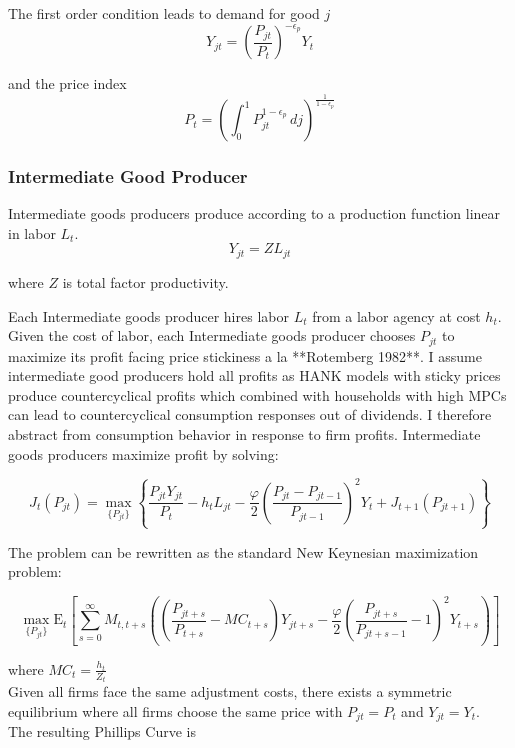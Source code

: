 \documentclass[\econtexRoot/HAFiscal]{subfiles}
\begin{document}
The first order condition leads to demand for good $j$
$$Y_{jt} = \left(\frac {P_{jt}}{P_{t}}\right)^{- \epsilon_{p}} Y_{t}$$

and the price index
$$P_{t} = \left(\int_{0}^{1} P_{jt}^{1-\epsilon_{p}}\,dj \right )^{\frac{1}{1-\epsilon_{p}}}$$


\subsubsection{Intermediate Good Producer}

Intermediate goods producers produce according to a production function linear in labor $L_{t}$. 
$$Y_{jt} =  Z  L_{jt}$$ 

where $Z$ is total factor productivity.
\vspace{.3cm}
  
 Each Intermediate goods producer hires labor $L_{t}$ from a labor agency at cost $h_{t}$. 
 Given the cost of labor, each Intermediate goods producer chooses $P_{jt}$ to maximize its profit facing price stickiness a la **Rotemberg 1982**. I assume intermediate good producers hold all profits as HANK models with sticky prices produce countercyclical profits which combined with households with high MPCs can lead to countercyclical consumption responses out of dividends. I therefore abstract from consumption behavior in response to firm profits. Intermediate goods producers maximize profit by solving:
 
$$J_{t}\left(P_{jt}\right) = \max_{\{P_{jt}\}} \left\{\frac{P_{jt}Y_{jt}}{P_{t}} - h_{t} L_{jt} -  \frac{\varphi}{2}\left( \frac{P_{jt} - P_{jt-1}}{P_{jt-1}} \right)^{2} Y_{t}  + J_{t+1}\left(P_{jt+1}\right) \right\}$$ 

The problem can be rewritten as the standard New Keynesian maximization problem:

$$\max_{\{P_{jt}\}} \mathrm{E}_{t}\left[\sum_{s=0}^{\infty}  M_{t,t+s} \left( \left( \frac{P_{jt+s}}{P_{t+s}} - MC_{t+s}\right)Y_{jt+s} -  \frac{\varphi}{2}\left( \frac{P_{jt+s}}{P_{jt+s-1}} - 1\right)^{2} Y_{t+s} \right)\right]$$ 


where $MC_{t} = \frac{h_{t}}{Z_{t}}  $ \\



Given all firms face the same adjustment costs, there exists a symmetric equilibrium where all firms choose the same price with $P_{jt} =P_{t}$ and $Y_{jt} =Y_{t}$.\\ 

The resulting Phillips Curve is
\end{document}
